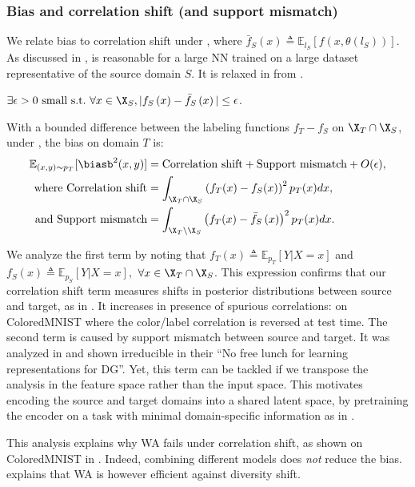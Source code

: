 \subsubsection{Bias and correlation shift (and support mismatch)}
\label{subsec:expression_ood_bias}
We relate \ood bias to correlation shift \cite{ye2021odbench} %
under , where $\bar{f}_{S}\left(x\right) \triangleq \mathbb{E}_{l_S} \left[f\left(x,\theta\left(l_S\right)\right)\right]$.
As discussed in ,  is reasonable for a large NN trained on a large dataset representative of the source domain $S$. 
It is relaxed in  from .
\begin{assumption}%
    $\exists \epsilon > 0 \text{~small~s.t.~} \forall x\in \X_S, |f_{S}\left(x\right)-\bar{f}_{S}\left(x\right)|\leq \epsilon$.%
    \label{ass:no_bias_iid}%
\end{assumption}%
\begin{proposition} \label{prop:bias}
    With a bounded difference between the labeling functions $f_T-f_S$ on $\X_T \cap \X_S$, under , the bias on domain $T$ is:
    \begin{equation}\label{eq:bias}
        \begin{aligned}
            \mathbb{E}_{(x,y)\sim p_T}[\biasb^2(x, y)] &= \text{Correlation shift} + \text{Support mismatch} + O(\epsilon), \\
            \text{where~} \text{Correlation shift} &= \int_{\X_T \cap \X_S} \left(f_T(x)-f_S(x)\right)^{2} p_T(x) dx, \\
            \text{and~} \text{Support mismatch} &= \int_{\X_T \setminus \X_S} \left(f_T(x)-\bar{f}_{S}\left(x\right)\right)^{2} p_T(x) dx.%
        \end{aligned}%
    \end{equation}
\end{proposition}%
We analyze the first term by noting that $f_T(x) \triangleq \mathbb{E}_{p_T}[Y|X=x]$ and $f_S(x) \triangleq \mathbb{E}_{p_S}[Y|X=x],$ $\forall x \in \X_T \cap \X_S$.
This expression confirms that our correlation shift term measures shifts in posterior distributions between source and target, as in \cite{ye2021odbench}.
It increases in presence of spurious correlations: \eg on ColoredMNIST \cite{arjovsky2019invariant} where the color/label correlation is reversed at test time.
The second term is caused by support mismatch between source and target.
It was analyzed in \cite{ruan2022optimal} and shown irreducible in their \enquote{No free lunch for learning representations for DG}.
Yet, this term can be tackled if we transpose the analysis in the feature space rather than the input space. This motivates encoding the source and target domains into a shared latent space, \eg by pretraining the encoder on a task with minimal domain-specific information as in \cite{ruan2022optimal}.

This analysis explains why WA fails under correlation shift, as shown on ColoredMNIST in .
Indeed, combining different models does \textit{not} reduce the bias.
 explains that WA is however efficient against diversity shift.%